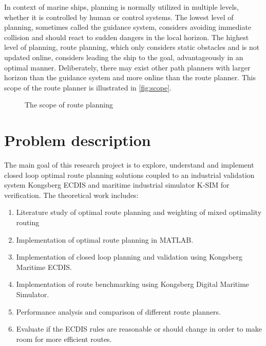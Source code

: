 In context of marine ships, planning is normally utilized in multiple levels, whether it is controlled by human or control systems. The lowest level of planning, sometimes called the guidance system, considers avoiding immediate collision and should react to sudden dangers in the local horizon. The highest level of planning, route planning, which only considers static obstacles and is not updated online, considers leading the ship to the goal, advantageously in an optimal manner. Deliberately, there may exist other path planners with larger horizon than the guidance system and more online than the route planner. This scope of the route planner is illustrated in \autoref{fig:scope}.

\begin{figure}[h]
\centering
{}


\caption{The scope of route planning}
\label{fig:scope}
    
\end{figure}



\section{Problem description}

The main goal of this research project is to explore, understand and implement closed loop optimal route planning solutions coupled to an industrial validation system Kongsberg ECDIS and maritime industrial simulator K-SIM for verification. The theoretical work includes: 

\begin{enumerate}
\item Literature study of optimal route planning and weighting of mixed optimality routing
\item Implementation of optimal route planning in MATLAB.
\item Implementation of closed loop planning and validation using Kongsberg Maritime ECDIS.
\item Implementation of route benchmarking using Kongsberg Digital Maritime Simulator.
\item Performance analysis and comparison of different route planners.
\item Evaluate if the ECDIS rules are reasonable or should change in order to make room for more efficient routes.
\end{enumerate}




